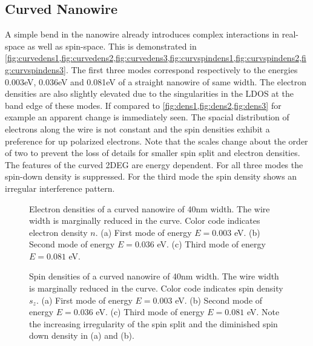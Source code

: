 \subsection{Curved Nanowire}
A simple bend in the nanowire already introduces complex interactions in real-space as well as spin-space. This is demonstrated in \cref{fig:curvedens1,fig:curvedens2,fig:curvedens3,fig:curvspindens1,fig:curvspindens2,fig:curvspindens3}. The first three modes correspond respectively to the energies 0.003eV, 0.036eV and 0.081eV of a straight nanowire of same width. The electron densities are also slightly elevated due to the singularities in the LDOS at the band edge of these modes. If compared to \cref{fig:dens1,fig:dens2,fig:dens3} for example an apparent change is immediately seen. The spacial distribution of electrons along the wire is not constant and the spin densities exhibit a preference for up polarized electrons. Note that the scales change about the order of two to prevent the loss of details for smaller spin split and electron densities. The features of the curved 2DEG are energy dependent. For all three modes the spin-down density is suppressed. For the third mode the spin density shows an irregular interference pattern.\par
\begin{figure}[h!]
\caption{Electron densities of a curved nanowire of 40nm width. The wire width is marginally reduced in the curve. Color code indicates electron density $n$. (a) First mode of energy $E=0.003$ eV. (b) Second mode of energy $E=0.036$ eV. (c) Third mode of energy $E=0.081$ eV. }
\end{figure}
\begin{figure}[h!]
\caption{Spin densities of a curved nanowire of 40nm width. The wire width is marginally reduced in the curve. Color code indicates spin density $s_z$. (a) First mode of energy $E=0.003$ eV. (b) Second mode of energy $E=0.036$ eV. (c) Third mode of energy $E=0.081$ eV. Note the increasing irregularity of the spin split and the diminished spin down density in (a) and (b).}
\end{figure}
